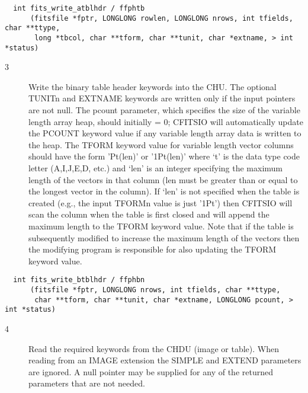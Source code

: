 \documentclass[11pt]{book}
\begin{document}
\begin{verbatim}
  int fits_write_atblhdr / ffphtb
      (fitsfile *fptr, LONGLONG rowlen, LONGLONG nrows, int tfields, char **ttype,
       long *tbcol, char **tform, char **tunit, char *extname, > int *status)
\end{verbatim}

\begin{description}
\item[3 ] Write the binary table header keywords into the CHU.   The optional
   TUNITn and EXTNAME keywords are written only if the input pointers
   are not null.  The pcount parameter, which specifies the
   size of the variable length array heap, should initially = 0;
   CFITSIO will automatically update the PCOUNT keyword value if any
   variable length array data is written to the heap.  The TFORM keyword
   value for variable length vector columns should have the form 'Pt(len)'
   or '1Pt(len)' where `t' is the data type code letter (A,I,J,E,D, etc.)
   and  `len' is an integer specifying the maximum length of the vectors
   in that column (len must be greater than or equal to the longest
   vector in the column).  If `len' is not specified when the table is
   created (e.g., the input TFORMn value is just '1Pt') then CFITSIO will
   scan the column when the table is first closed and will append the
   maximum length to the TFORM keyword value.  Note that if the table
   is subsequently modified to increase the maximum length of the vectors
   then the modifying program is responsible for also updating the TFORM
  keyword value.  \label{ffphbn}
\end{description}

\begin{verbatim}
  int fits_write_btblhdr / ffphbn
      (fitsfile *fptr, LONGLONG nrows, int tfields, char **ttype,
       char **tform, char **tunit, char *extname, LONGLONG pcount, > int *status)
\end{verbatim}

\begin{description}
\item[4 ] Read the required keywords from the CHDU (image or table).  When
    reading from an IMAGE extension the SIMPLE and EXTEND parameters are
    ignored.  A null pointer may be supplied for any of the returned
   parameters that are not needed. \label{ffghpr} \label{ffghtb} \label{ffghbn}
\end{description}
\end{document}
